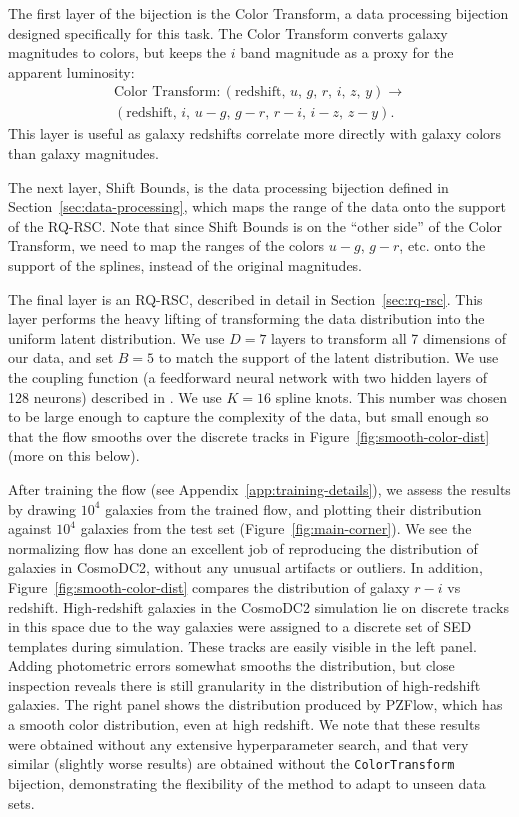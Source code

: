 \documentclass[twocolumn,twocolappendix]{aastex631}
\begin{document}
The first layer of the bijection is the Color Transform, a data processing bijection designed specifically for this task.
The Color Transform converts galaxy magnitudes to colors, but keeps the $i$ band magnitude as a proxy for the apparent luminosity:
\begin{multline}
    \text{Color Transform} : (\text{redshift},\, u,\, g,\, r,\, i,\, z,\, y) \to \\
    (\text{redshift},\, i,\, u-g,\, g-r,\, r-i,\, i-z,\, z-y).
\end{multline}
This layer is useful as galaxy redshifts correlate more directly with galaxy colors than galaxy magnitudes.

The next layer, Shift Bounds, is the data processing bijection defined in Section~\ref{sec:data-processing}, which maps the range of the data onto the support of the RQ-RSC.
Note that since Shift Bounds is on the ``other side'' of the Color Transform, we need to map the ranges of the colors $u-g$, $g-r$, etc. onto the support of the splines, instead of the original magnitudes.

The final layer is an RQ-RSC, described in detail in Section~\ref{sec:rq-rsc}.
This layer performs the heavy lifting of transforming the data distribution into the uniform latent distribution.
We use $D=7$ layers to transform all 7 dimensions of our data, and set $B=5$ to match the support of the latent distribution.
We use the coupling function (a feedforward neural network with two hidden layers of 128 neurons) described in \citet{durkan2019}.
We use $K=16$ spline knots.
This number was chosen to be large enough to capture the complexity of the data, but small enough so that the flow smooths over the discrete tracks in Figure~\ref{fig:smooth-color-dist} (more on this below).

After training the flow (see Appendix~\ref{app:training-details}), we assess the results by drawing $10^4$ galaxies from the trained flow, and plotting their distribution against  $10^4$ galaxies from the test set (Figure~\ref{fig:main-corner}).
We see the normalizing flow has done an excellent job of reproducing the distribution of galaxies in CosmoDC2, without any unusual artifacts or outliers.
In addition, Figure~\ref{fig:smooth-color-dist} compares the distribution of galaxy $r-i$ vs redshift.
High-redshift galaxies in the CosmoDC2 simulation lie on discrete tracks in this space due to the way galaxies were assigned to a discrete set of SED templates during simulation.
These tracks are easily visible in the left panel.
Adding photometric errors somewhat smooths the distribution, but close inspection reveals there is still granularity in the distribution of high-redshift galaxies.
The right panel shows the distribution produced by PZFlow, which has a smooth color distribution, even at high redshift.
We note that these results were obtained without any extensive hyperparameter search, and that very similar (slightly worse results) are obtained without the \texttt{ColorTransform} bijection, demonstrating the flexibility of the method to adapt to unseen data sets.
\end{document}
